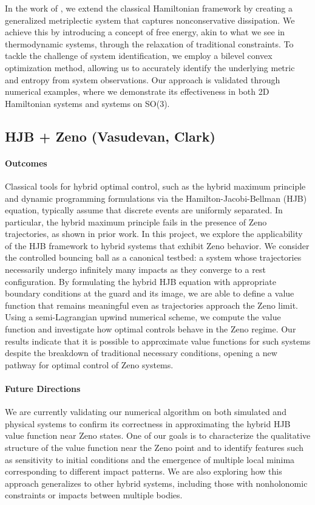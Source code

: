 \documentclass[letterpaper,11pt]{article}
\begin{document}
In the work of \cite{teng2024generalized}, we extend the classical Hamiltonian framework by creating a generalized metriplectic system that captures nonconservative dissipation. We achieve this by introducing a concept of free energy, akin to what we see in thermodynamic systems, through the relaxation of traditional constraints. To tackle the challenge of system identification, we employ a bilevel convex optimization method, allowing us to accurately identify the underlying metric and entropy from system observations. Our approach is validated through numerical examples, where we demonstrate its effectiveness in both 2D Hamiltonian systems and systems on SO(3). 

\subsection{HJB + Zeno (Vasudevan, Clark)}

\paragraph{Outcomes} Classical tools for hybrid optimal control, such as the hybrid maximum principle and dynamic programming formulations via the Hamilton-Jacobi-Bellman (HJB) equation, typically assume that discrete events are uniformly separated. 
In particular, the hybrid maximum principle fails in the presence of Zeno trajectories, as shown in prior work.
In this project, we explore the applicability of the HJB framework to hybrid systems that exhibit Zeno behavior.
We consider the controlled bouncing ball as a canonical testbed: a system whose trajectories necessarily undergo infinitely many impacts as they converge to a rest configuration. 
By formulating the hybrid HJB equation with appropriate boundary conditions at the guard and its image, we are able to define a value function that remains meaningful even as trajectories approach the Zeno limit. 
Using a semi-Lagrangian upwind numerical scheme, we compute the value function and investigate how optimal controls behave in the Zeno regime. 
Our results indicate that it is possible to approximate value functions for such systems despite the breakdown of traditional necessary conditions, opening a new pathway for optimal control of Zeno systems.


\paragraph*{Future Directions} We are currently validating our numerical algorithm on both simulated and physical systems to confirm its correctness in approximating the hybrid HJB value function near Zeno states. 
One of our goals is to characterize the qualitative structure of the value function near the Zeno point and to identify features such as sensitivity to initial conditions and the emergence of multiple local minima corresponding to different impact patterns.
We are also exploring how this approach generalizes to other hybrid systems, including those with nonholonomic constraints or impacts between multiple bodies.
\end{document}

